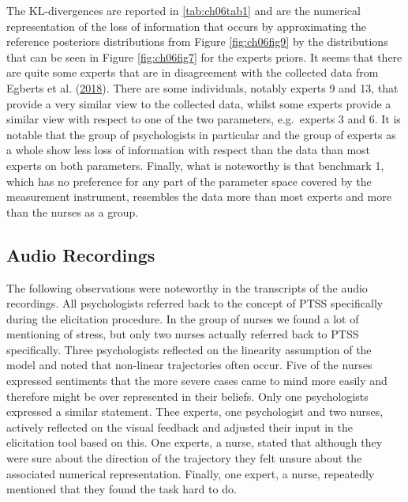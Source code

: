\documentclass[openright,titlepage,12pt,a4paper]{book}
\begin{document}
The KL-divergences are reported in \ref{tab:ch06tab1} and are the numerical representation of the loss of information that occurs by approximating the reference posteriors distributions from Figure \ref{fig:ch06fig9} by the distributions that can be seen in Figure \ref{fig:ch06fig7} for the experts priors. It seems that there are quite some experts that are in disagreement with the collected data from Egberts et al. (\protect\hyperlink{ref-egberts_mother_2018}{2018}). There are some individuals, notably experts 9 and 13, that provide a very similar view to the collected data, whilst some experts provide a similar view with respect to one of the two parameters, e.g.~experts 3 and 6. It is notable that the group of psychologists in particular and the group of experts as a whole show less loss of information with respect than the data than most experts on both parameters. Finally, what is noteworthy is that benchmark 1, which has no preference for any part of the parameter space covered by the measurement instrument, resembles the data more than most experts and more than the nurses as a group.

\hypertarget{audio-recordings}{%
\subsection{Audio Recordings}\label{audio-recordings}}

The following observations were noteworthy in the transcripts of the audio recordings. All psychologists referred back to the concept of PTSS specifically during the elicitation procedure. In the group of nurses we found a lot of mentioning of stress, but only two nurses actually referred back to PTSS specifically. Three psychologists reflected on the linearity assumption of the model and noted that non-linear trajectories often occur. Five of the nurses expressed sentiments that the more severe cases came to mind more easily and therefore might be over represented in their beliefs. Only one psychologists expressed a similar statement. Thee experts, one psychologist and two nurses, actively reflected on the visual feedback and adjusted their input in the elicitation tool based on this. One experts, a nurse, stated that although they were sure about the direction of the trajectory they felt unsure about the associated numerical representation. Finally, one expert, a nurse, repeatedly mentioned that they found the task hard to do.
\end{document}
